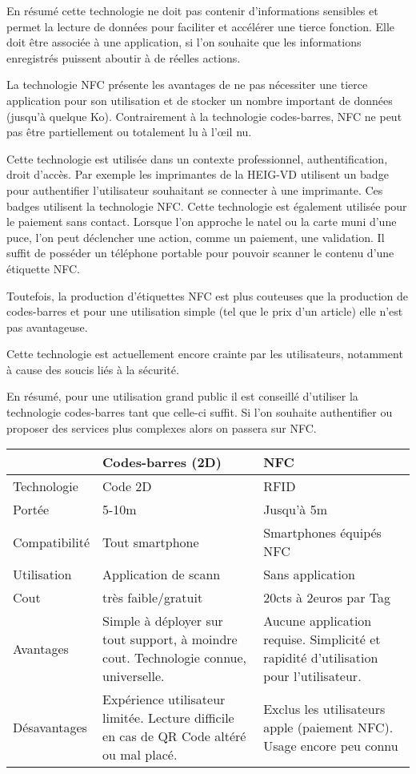 \documentclass[francais,12pt]{article}
\begin{document}
	En résumé cette technologie ne doit pas contenir d'informations sensibles et permet la lecture de données pour faciliter et accélérer une tierce fonction. Elle doit être associée à une application, si l'on souhaite que les informations enregistrés puissent aboutir à de réelles actions.
	
	La technologie NFC présente les avantages de ne pas nécessiter une tierce application pour son utilisation et de stocker un nombre important de données (jusqu'à quelque Ko). Contrairement à la technologie codes-barres, NFC ne peut pas être partiellement ou totalement lu à l'œil nu. 
	
	Cette technologie est utilisée dans un contexte professionnel, authentification, droit d'accès. Par exemple les imprimantes de la HEIG-VD utilisent un badge pour authentifier l'utilisateur souhaitant se connecter à une imprimante. Ces badges utilisent la technologie NFC. Cette technologie est également utilisée pour le paiement sans contact. Lorsque l'on approche le natel ou la carte muni d'une puce, l'on peut déclencher une action, comme un paiement, une validation.	
	Il suffit de posséder un téléphone portable pour pouvoir scanner le contenu d'une étiquette NFC. 
	
	Toutefois, la production d'étiquettes NFC est plus couteuses que la production de codes-barres et pour une utilisation simple (tel que le prix d'un article) elle n'est pas avantageuse. 
	
	Cette technologie est actuellement encore crainte par les utilisateurs, notamment à cause des soucis liés à la sécurité. 	
	
	En résumé, pour une utilisation grand public il est conseillé d'utiliser la technologie codes-barres tant que celle-ci suffit. Si l'on souhaite authentifier ou proposer des services plus complexes alors on passera sur NFC.
		
	\begin{tabular}{|l|p{6cm}|p{6cm}|}
		\hline 
		\rowcolor{lightgray}& Codes-barres (2D) & NFC \\ 
		\hline 
		Technologie & Code 2D  & RFID  \\ 
		\hline 
		Portée & 5-10m  & Jusqu'à 5m \\ 
		\hline 
		Compatibilité & Tout smartphone  & Smartphones équipés NFC  \\ 
		\hline 
		Utilisation & Application de scann & Sans application \\ 
		\hline 
		Cout &  très faible/gratuit & 20cts à 2euros par Tag \\ 
		\hline 
		Avantages & Simple à déployer sur tout support, à moindre cout. Technologie connue, universelle.  & Aucune application requise. Simplicité et rapidité d'utilisation pour l'utilisateur. \\ 
		\hline 
		Désavantages & Expérience utilisateur limitée. Lecture difficile en cas de QR Code altéré ou mal placé. & Exclus les utilisateurs apple (paiement NFC). Usage encore peu connu \\ 
		\hline 
	\end{tabular} 
	
\end{document}
